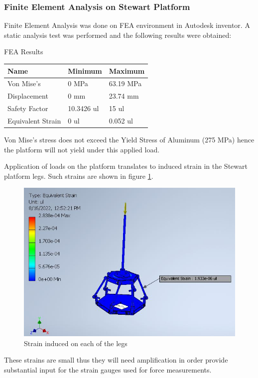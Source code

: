 \subsubsection{Finite Element Analysis on Stewart Platform}
Finite Element Analysis was done on FEA environment in Autodesk inventor. A static analysis test was performed and the following results were obtained:
\begin{table}[H]
\caption{FEA Results}
\end{table}
\begin{center}
\begin{tabular}{|l|l|l|}
\hline
\textbf{Name} & \textbf{Minimum} & \textbf{Maximum}\\
\hline
Von Mise's & 0 MPa & 63.19 MPa\\
\hline
Displacement & 0 mm & 23.74 mm\\
\hline
Safety Factor & 10.3426 ul & 15 ul\\
\hline
Equivalent Strain & 0 ul & 0.052 ul\\
\hline
\end{tabular}
\end{center}
Von Mise's stress does not exceed the Yield Stress of Aluminum (275 MPa) hence the platform will not yield under this applied load.

Application of loads on the platform translates to induced strain in the Stewart platform legs. Such strains are shown in figure \ref{eq}.
\begin{center}
	\begin{figure}[H]
	\centering
	\includegraphics[width=0.6\linewidth]{Figures/Equivalent}
	\caption[Equivalent strain]{Strain induced on each of the legs}
	\label{eq}
	\end{figure}
\end{center}
These strains are small thus they will need amplification in order provide substantial input for the strain gauges used for force measurements. 
